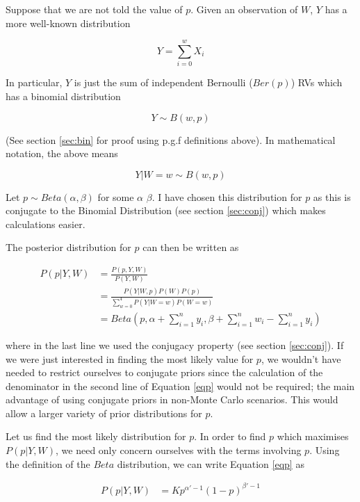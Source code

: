 \documentclass{article}
\begin{document}
\begin{flushleft}
Suppose that we are not told the value of $p$. Given an observation of $W$, $Y$ has a more well-known distribution

$$Y = \sum_{i=0}^w X_i$$

In particular, $Y$ is just the sum of independent Bernoulli ($Ber(p)$) RVs which has a binomial distribution

$$Y \sim B(w,p)$$

(See section \ref{sec:bin} for proof using p.g.f definitions above). In mathematical notation, the above means

$$Y|W=w \sim B(w,p)$$

Let $p \sim Beta(\alpha, \beta)$ for some $\alpha$ $\beta$. I have chosen this distribution for $p$ as this is conjugate to the Binomial Distribution (see section \ref{sec:conj}) which makes calculations easier.\newline

The posterior distribution for $p$ can then be written as

\begin{equation} \label{eqp}
\begin{split}
P(p|Y,W) & = \frac{P(p,Y,W)}{P(Y,W)} \\
& = \frac{P(Y|W,p) P(W) P(p)}{\sum_{w=0}^4 P(Y|W=w) P(W=w)} \\
& = Beta(p,\alpha + \sum_{i=1}^n y_i, \beta + \sum_{i=1}^n w_i - \sum_{i=1}^n y_i)
\end{split}
\end{equation}

where in the last line we used the conjugacy property (see section \ref{sec:conj}). If we were just interested in finding the most likely value for $p$, we wouldn't have needed to restrict ourselves to conjugate priors since the calculation of the denominator in the second line of Equation \ref{eqp} would not be required; the main advantage of using conjugate priors in non-Monte Carlo scenarios. This would allow a larger variety of prior distributions for $p$.

Let us find the most likely distribution for $p$. In order to find $p$ which maximises $P(p|Y,W)$, we need only concern ourselves with the terms involving $p$. Using the definition of the $Beta$ distribution, we can write Equation \ref{eqp} as

\begin{equation} \label{eqmle}
\begin{split}
P(p|Y,W) & = K p^{\alpha'-1}(1-p)^{\beta'-1}
\end{split}
\end{equation}


\end{flushleft}
\end{document}
